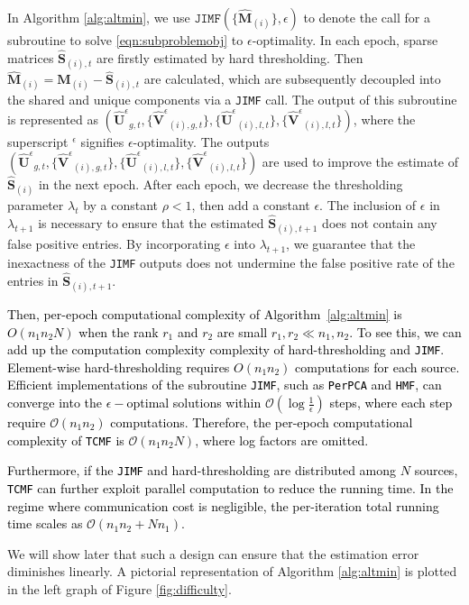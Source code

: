 \documentclass[twoside,11pt]{article}
\def\name{\texttt{TCMF}\xspace}
\def\inneralg{\texttt{JIMF}\xspace}
\def\perpca{\texttt{PerPCA}\xspace}
\def\hmf{\texttt{HMF}\xspace}
\newcommand{\revise}[1]{\textcolor{black}{ #1}}
\newcommand{\matM}{\mathbf{M}}
\newcommand{\hmatM}{\hat{\mathbf{M}}}
\newcommand{\hmatS}{\hat{\mathbf{S}}}
\newcommand{\hmatUeps}{\hat{\mathbf{U}}^{\epsilon}{}}
\newcommand{\hmatVeps}{\hat{\mathbf{V}}^{\epsilon}{}}
\begin{document}
In Algorithm \ref{alg:altmin},  we use $\inneralg\left(\{\hmatM_{(i)}\},\epsilon\right)$ to denote the call for a subroutine to solve \eqref{eqn:subproblemobj} to $\epsilon$-optimality. In each epoch, sparse matrices $\hmatS_{(i),t}$ are firstly estimated by hard thresholding. Then $\hmatM_{(i)}=\matM_{(i)}-\hmatS_{(i),t}$ are calculated, which are subsequently decoupled into the shared and unique components via a \inneralg call. The output of this subroutine is represented as $(\hmatUeps_{g,t},\{\hmatVeps_{(i),g,t}\},\{\hmatUeps_{(i),l,t}\},\{\hmatVeps_{(i),l,t}\})$, where the superscript ${}^{\epsilon}$ signifies $\epsilon$-optimality. The outputs $(\hmatUeps_{g,t},\{\hmatVeps_{(i),g,t}\},\{\hmatUeps_{(i),l,t}\},\{\hmatVeps_{(i),l,t}\})$ are used to improve the estimate of $\hmatS_{(i)}$ in the next epoch. After each epoch, we decrease the thresholding parameter $\lambda_t$ by a constant $\rho<1$, then add a constant $\epsilon$. The inclusion of $\epsilon$ in $\lambda_{t+1}$ is necessary to ensure that the estimated $\hmatS_{(i),t+1}$ does not contain any false positive entries. By incorporating $\epsilon$ into $\lambda_{t+1}$, we guarantee that the inexactness of the \inneralg outputs does not undermine the false positive rate of the entries in $\hmatS_{(i),t+1}$.

\revise{ Then, per-epoch computational complexity of Algorithm~\ref{alg:altmin} is $O(n_1n_2N)$ when the rank $r_1$ and $r_2$ are small $r_1,r_2\ll n_1,n_2$. To see this, we can add up the computation complexity complexity of hard-thresholding and \inneralg. Element-wise hard-thresholding requires $O(n_1n_2)$ computations for each source. Efficient implementations of the subroutine \inneralg, such as \perpca and \hmf, can converge into the $\epsilon-$optimal solutions within $\mathcal{O}(\log\frac{1}{\epsilon})$ steps, where each step require $\mathcal{O}(n_1n_2)$ computations. Therefore, the per-epoch computational complexity of \name is $\mathcal{O}(n_1n_2N)$, where log factors are omitted.}

\revise{Furthermore, if the \inneralg and hard-thresholding are distributed among $N$ sources, \name can further exploit parallel computation to reduce the running time. In the regime where communication cost is negligible, the per-iteration total running time scales as $\mathcal{O}\left(n_1n_2+Nn_1\right)$.}

We will show later that such a design can ensure that the estimation error diminishes linearly. A pictorial representation of Algorithm \ref{alg:altmin} is plotted in the left graph of Figure \ref{fig:difficulty}. 
\end{document}
